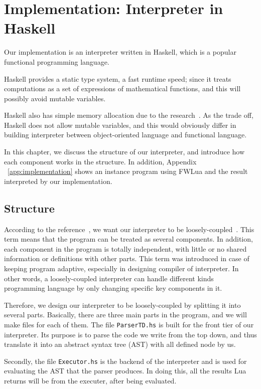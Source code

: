 \chapter{Implementation: Interpreter in Haskell}\label{chp: implementation}
Our implementation is an interpreter written in Haskell, which is a popular functional programming language. 

Haskell provides a static type system, a fast runtime speed; since it treats computations as a set of expressions of mathematical functions, and this will possibly avoid mutable variables. 

Haskell also has simple memory allocation due to the research~\cite{PIH}. As the trade off, Haskell does not allow mutable variables, and this would obviously differ in building interpreter between object-oriented language and functional language.

In this chapter, we discuss the structure of our interpreter, and introduce how each component works in the structure. In addition, Appendix ~\ref{app:implementation} shows an instance program using FWLua and the result interpreted by our implementation.

\section{Structure}
According to the reference~\cite{WCAI}, we want our interpreter to be loosely-coupled~\cite{looseC}. This term means that the program can be treated as several components. In addition, each component in the program is totally independent, with little or no shared information or definitions with other parts. This term was introduced in case of keeping program adaptive, especially in designing compiler of interpreter. In other words, a loosely-coupled interpreter can handle different kinds programming language by only changing specific key components in it.

Therefore, we design our interpreter to be loosely-coupled by splitting it into several parts. Basically, there are three main parts in the program, and we will make files for each of them. The file {\tt ParserTD.hs} is built for the front tier of our interpreter. Its purpose is to parse the code we write from the top down, and thus translate it into an abstract syntax tree (AST) with all defined node by us. 

Secondly, the file {\tt Executor.hs} is the backend of the interpreter and is used for evaluating the AST that the parser produces. In doing this, all the results Lua returns will be from the executer, after being evaluated. 

